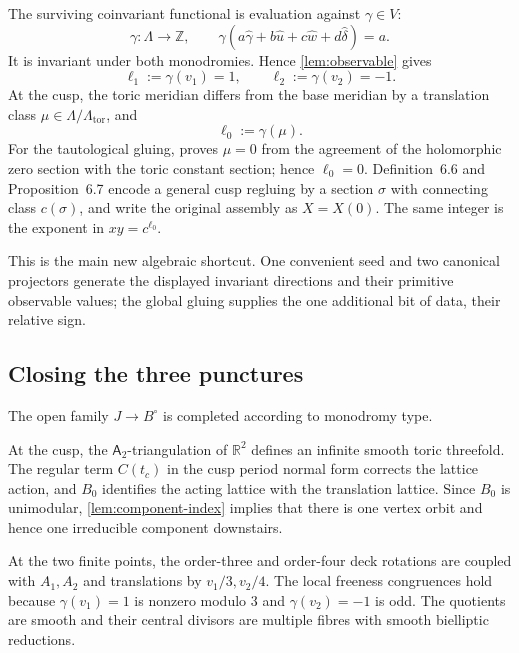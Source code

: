 \documentclass[11pt,reqno]{amsart}
\numberwithin{equation}{section}
\newcommand{\Z}{\mathbb Z}
\newcommand{\R}{\mathbb R}
\newcommand{\wideg}{\widehat\gamma}
\newcommand{\wideu}{\widehat u}
\newcommand{\widew}{\widehat w}
\newcommand{\wided}{\widehat\delta}
\newcommand{\LambdaTor}{\Lambda_{\mathrm{tor}}}
\newcommand{\Aroot}{\mathsf{A}_2}
\theoremstyle{definition}
\begin{document}
The surviving coinvariant functional is evaluation against $\gamma\in V$:
\[
\gamma:\Lambda\longrightarrow\Z,
\qquad
\gamma(a\wideg+b\wideu+c\widew+d\wided)=a.
\]
It is invariant under both monodromies. Hence \cref{lem:observable} gives
\begin{equation}\label{eq:ell-values}
\ell_1:=\gamma(v_1)=1,
\qquad
\ell_2:=\gamma(v_2)=-1.
\end{equation}
At the cusp, the toric meridian differs from the base meridian by a translation class $\mu\in\Lambda/\LambdaTor$, and
\begin{equation}\label{eq:ell0-definition}
\ell_0:=\gamma(\mu).
\end{equation}
For the tautological gluing, \cite[\S7.5]{S6} proves $\mu=0$ from the agreement of the holomorphic zero section with the toric constant section; hence $\ell_0=0$. Definition~6.6 and Proposition~6.7 encode a general cusp regluing by a section $\sigma$ with connecting class $c(\sigma)$, and write the original assembly as $X=X(0)$. The same integer is the exponent in $xy=c^{\ell_0}$.

This is the main new algebraic shortcut. One convenient seed and two canonical projectors generate the displayed invariant directions and their primitive observable values; the global gluing supplies the one additional bit of data, their relative sign.

\subsection{Closing the three punctures}

The open family $J\to B^\circ$ is completed according to monodromy type.

At the cusp, the $\Aroot$-triangulation of $\R^2$ defines an infinite smooth toric threefold. The regular term $C(t_c)$ in the cusp period normal form corrects the lattice action, and $B_0$ identifies the acting lattice with the translation lattice. Since $B_0$ is unimodular, \cref{lem:component-index} implies that there is one vertex orbit and hence one irreducible component downstairs.

At the two finite points, the order-three and order-four deck rotations are coupled with $A_1,A_2$ and translations by $v_1/3,v_2/4$. The local freeness congruences hold because $\gamma(v_1)=1$ is nonzero modulo $3$ and $\gamma(v_2)=-1$ is odd. The quotients are smooth and their central divisors are multiple fibres with smooth bielliptic reductions.
\end{document}
